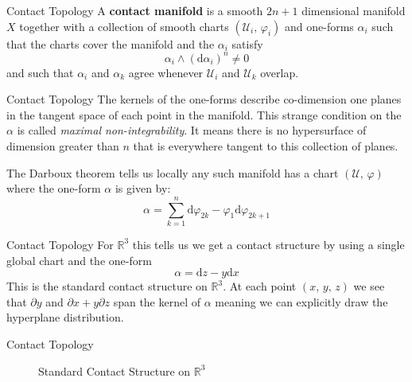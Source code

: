 \documentclass{beamer}
\begin{document}
    \begin{frame}{Contact Topology}
        A \textbf{contact manifold} is a smooth $2n+1$ dimensional
        manifold $X$ together with a
        collection of smooth charts $(\mathcal{U}_{i},\,\varphi_{i})$ and
        one-forms $\alpha_{i}$ such that the charts cover the manifold and
        the $\alpha_{i}$ satisfy
        \begin{equation}
            \alpha_{i}\land(\textrm{d}\alpha_{i})^{n}\ne{0}
        \end{equation}
        and such that $\alpha_{i}$ and $\alpha_{k}$ agree whenever
        $\mathcal{U}_{i}$ and $\mathcal{U}_{k}$ overlap.
    \end{frame}
    \begin{frame}{Contact Topology}
        The kernels of the one-forms describe co-dimension one planes in the
        tangent space of each point in the manifold.
        This strange condition on the $\alpha$ is called
        \textit{maximal non-integrability}. It means there is no hypersurface
        of dimension greater than $n$ that is everywhere tangent to this
        collection of planes.
        \par\hfill\par
        The Darboux theorem tells us locally any such manifold has a chart
        $(\mathcal{U},\,\varphi)$ where the one-form $\alpha$ is given by:
        \begin{equation}
            \alpha=\sum_{k=1}^{n}
                \textrm{d}\varphi_{2k}-\varphi_{1}\textrm{d}\varphi_{2k+1}
        \end{equation}
    \end{frame}
    \begin{frame}{Contact Topology}
        For $\mathbb{R}^{3}$ this tells us we get a contact structure by using
        a single global chart and the one-form
        \begin{equation}
            \alpha=\textrm{d}z-y\textrm{d}x
        \end{equation}
        This is the standard contact structure on $\mathbb{R}^{3}$. At each
        point $(x,\,y,\,z)$ we see that
        $\partial{y}$ and $\partial{x}+y\partial{z}$ span the kernel of
        $\alpha$ meaning we can explicitly draw the hyperplane distribution.
    \end{frame}
    \begin{frame}{Contact Topology}
        \begin{figure}
            \centering
            \caption{Standard Contact Structure on $\mathbb{R}^{3}$}
        \end{figure}
    \end{frame}
\end{document}

